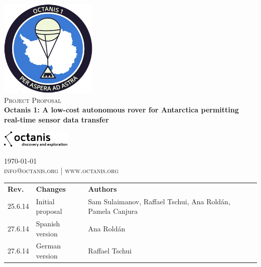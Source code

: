 \documentclass[a4paper,12pt]{article}
\begin{document}
\begin{titlepage}
\begin{center}

\includegraphics[width=0.35\textwidth]{patch}~\\[2cm]

\textsc{\Large Project Proposal}\\[0.5cm]

\huge \bfseries Octanis 1: A low-cost autonomous rover for Antarctica permitting real-time sensor data transfer \\[0.4cm] 

  
\vspace{23pt}

\includegraphics[width=0.25\textwidth]{black_logo} \\


\vfill



{\large \today} \\
\textsc{\small info@octanis.org | www.octanis.org}
\vspace{50pt}


\begin{table}[h!]
\centering
\vspace{1pt}
\begin{tabular}{ l  l  l }
	\textbf{Rev.} & \textbf{Changes} & \textbf{Authors} \\
	25.6.14 & Initial proposal & Sam Sulaimanov, Raffael Tschui, Ana Roldán, Pamela Canjura \\
	27.6.14 & Spanish version & Ana Roldán \\
	27.6.14 & German version & Raffael Tschui \\
\end{tabular}
\end{table}

\end{center}
\end{titlepage}
\end{document}
